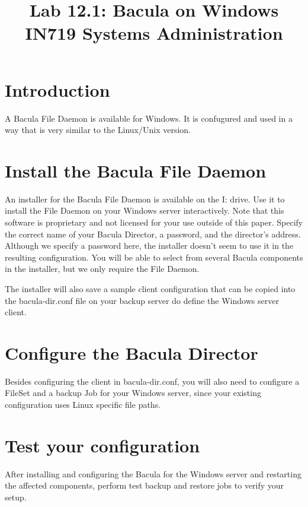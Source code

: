 \documentclass{article}   	%
\title{Lab 12.1:  Bacula on Windows\\ IN719 Systems Administration}
\date{}							%
\begin{document}
\maketitle

\section*{Introduction}
A Bacula File Daemon is available for Windows. It is confugured and used in a way that is very similar to the Linux/Unix version.

\section{Install the Bacula File Daemon}
An installer for the Bacula File Daemon is available on the I: drive.  Use it to install the File Daemon on your Windows server interactively.  Note that this software is proprietary and not licensed for your use outside of this paper.  Specify the correct name of your Bacula Director, a password, and the director's address.  Although we specify a password here, the installer doesn't seem to use it in the resulting configuration.  You will be able to select from several Bacula components in the installer, but we only require the File Daemon.

The installer will also save a sample client configuration that can be copied into the bacula-dir.conf file on your backup server do define the Windows server client.

\section{Configure the Bacula Director}
Besides configuring the client in bacula-dir.conf, you will also need to configure a FileSet and a backup Job for your Windows server, since your existing configuration uses Linux specific file paths.

\section{Test your configuration}
After installing and configuring the Bacula for the Windows server and restarting the affected components, perform test backup and restore jobs to verify your setup.
\end{document}
